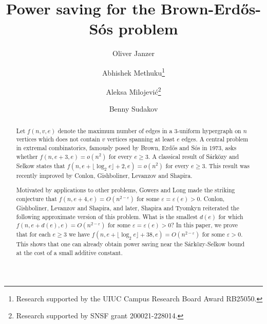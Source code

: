\documentclass{daj}
\def\eps{\varepsilon}
\theoremstyle{plain}
\theoremstyle{remark}
\begin{document}
\begin{frontmatter}[classification=text]

\title{Power saving for the Brown-Erd\H os-S\'os problem} %

\author[oliver]{Oliver Janzer}
\author[abhishek]{Abhishek Methuku\thanks{Research supported by the UIUC Campus Research Board Award RB25050.}}
\author[aleksa]{Aleksa Milojevi\'c\thanks{Research supported by SNSF grant 200021-228014.}}
\author[benny]{Benny Sudakov\footnotemark[2]}

\begin{abstract}
Let $f(n, v, e)$ denote the maximum number of edges in a 3-uniform hypergraph on $n$ vertices which does not contain $v$ vertices spanning at least $e$ edges. A central problem in extremal combinatorics, famously posed by Brown, Erd\H{o}s and S\'os in 1973, asks whether $f(n, e+3, e)=o(n^2)$ for every $e \ge 3$. A classical result of S\'ark\"ozy and Selkow states that $f(n, e+\lfloor \log_2 e\rfloor+2, e)=o(n^{2})$ for every $e \ge 3$. This result was recently improved by Conlon, Gishboliner, Levanzov and Shapira.

Motivated by applications to other problems, Gowers and Long made the striking conjecture that $f(n, e+4, e)=O(n^{2-\eps})$ for some $\eps=\eps(e)>0$.  Conlon, Gishboliner, Levanzov and Shapira, and later, Shapira and Tyomkyn reiterated the following approximate version of this problem. What is the smallest $d(e)$ for which $f(n, e+d(e), e)=O(n^{2-\eps})$ for some $\eps=\eps(e)>0$? In this paper, we prove that for each $e\geq 3$ we have $f(n, e+\lfloor \log_2 e\rfloor +38, e)=O(n^{2-\eps})$ for some $\eps>0$. This shows that one can already obtain power saving near the S\'ark\"ozy-Selkow bound at the cost of a small additive constant.
\end{abstract}
\end{frontmatter}
\end{document}
